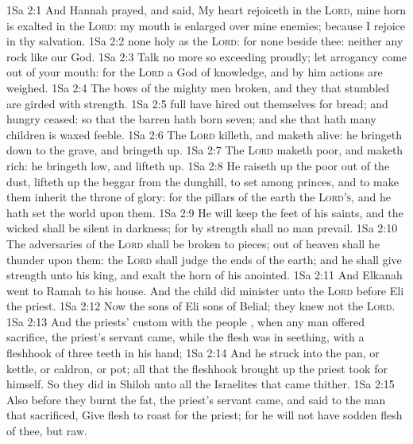\vs 1Sa 2:1 And Hannah prayed, and said, My heart rejoiceth in the \textsc{Lord}, mine horn is exalted in the \textsc{Lord}: my mouth is enlarged over mine enemies; because I rejoice in thy salvation.
\vs 1Sa 2:2  none holy as the \textsc{Lord}: for  none beside thee: neither  any rock like our God.
\vs 1Sa 2:3 Talk no more so exceeding proudly; let  arrogancy come out of your mouth: for the \textsc{Lord}  a God of knowledge, and by him actions are weighed.
\vs 1Sa 2:4 The bows of the mighty men  broken, and they that stumbled are girded with strength.
\vs 1Sa 2:5  full have hired out themselves for bread; and  hungry ceased: so that the barren hath born seven; and she that hath many children is waxed feeble.
\vs 1Sa 2:6 The \textsc{Lord} killeth, and maketh alive: he bringeth down to the grave, and bringeth up.
\vs 1Sa 2:7 The \textsc{Lord} maketh poor, and maketh rich: he bringeth low, and lifteth up.
\vs 1Sa 2:8 He raiseth up the poor out of the dust,  lifteth up the beggar from the dunghill, to set  among princes, and to make them inherit the throne of glory: for the pillars of the earth  the \textsc{Lord's}, and he hath set the world upon them.
\vs 1Sa 2:9 He will keep the feet of his saints, and the wicked shall be silent in darkness; for by strength shall no man prevail.
\vs 1Sa 2:10 The adversaries of the \textsc{Lord} shall be broken to pieces; out of heaven shall he thunder upon them: the \textsc{Lord} shall judge the ends of the earth; and he shall give strength unto his king, and exalt the horn of his anointed.
\vs 1Sa 2:11 And Elkanah went to Ramah to his house. And the child did minister unto the \textsc{Lord} before Eli the priest.
\vs 1Sa 2:12 Now the sons of Eli  sons of Belial; they knew not the \textsc{Lord}.
\vs 1Sa 2:13 And the priests' custom with the people , when any man offered sacrifice, the priest's servant came, while the flesh was in seething, with a fleshhook of three teeth in his hand;
\vs 1Sa 2:14 And he struck  into the pan, or kettle, or caldron, or pot; all that the fleshhook brought up the priest took for himself. So they did in Shiloh unto all the Israelites that came thither.
\vs 1Sa 2:15 Also before they burnt the fat, the priest's servant came, and said to the man that sacrificed, Give flesh to roast for the priest; for he will not have sodden flesh of thee, but raw.
